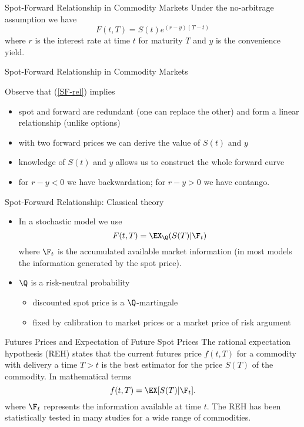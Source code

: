 {%
{Spot-Forward Relationship in Commodity Markets }
Under the no-arbitrage assumption we have
\begin{equation}\label{SF-rel}
F(t,T)=S(t)e^{(r-y)(T-t)}
\end{equation}
where $r$ is the interest rate at time $t$ for maturity $T$ and $y$ is the convenience yield.





{Spot-Forward Relationship in Commodity Markets }


Observe that (\ref{SF-rel}) implies
\begin{itemize}
\item<1-> spot and forward are redundant (one can replace the other) and form a
linear relationship (unlike options)
\item<2-> with two forward prices we can derive the value of $S(t)$ and $y$
\item<3-> knowledge of $S(t)$ and $y$ allows us to construct the whole forward curve
\item<4-> for $r-y <0$ we have backwardation; for $r-y>0$ we have contango.
\end{itemize}




{Spot-Forward Relationship: Classical theory}
\begin{itemize}
\item<1-> In a stochastic model we use
$$
F(t,T)=\EX_{\Q}(S(T)|\F_t)
$$
where $\F_t$ is the accumulated available market information (in most models the information generated by the spot price).
\item<2-> $\Q$ is a risk-neutral probability
\begin{itemize}
\item discounted spot price is a $\Q$-martingale
\item fixed by calibration to market prices or a market price of risk argument
\end{itemize}
\end{itemize}



{Futures Prices and Expectation of Future Spot Prices}
The rational expectation hypothesis (REH) states that the current futures price $f(t,T)$ for a commodity with
delivery a time $T>t$ is the best estimator for the price $S(T)$ of the commodity.
In mathematical terms
\begin{equation}\label{REH}
f(t,T) = \EX[S(T) |\F_t].
\end{equation}
where $\F_t$ represents the information available at time $t$. The REH has been statistically
tested in many studies for a wide range of commodities.



}
